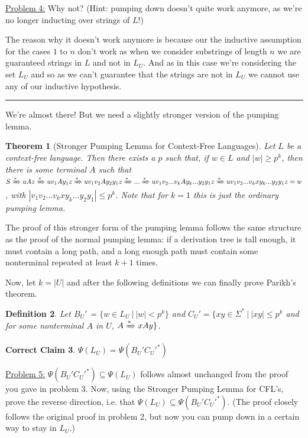 \documentclass[11pt]{article}
\newcounter{lecnum}
\newtheorem{theorem}{Theorem}[lecnum]
\newtheorem{definition}[theorem]{Definition}
\newtheorem{goodclaim}[theorem]{Correct Claim}
\newenvironment{proof}{{\bf Proof:}}{\hfill\rule{2mm}{2mm}}
\begin{document}
\underline{Problem 4:} Why not? (Hint: pumping down doesn't quite work anymore, as we're no longer inducting over strings of $L$!) \hbreak \newline

\begin{proof}
  The reason why it doesn't work anymore is because our the inductive assumption for the cases $1$ to $n$ don't work as when we consider substrings of length $n$ we are guaranteed strings in $L$ and not in $L_U$. And as in this case we're considering the set $L_U$ and so as we can't guarantee that the strings are not in $L_U$  we cannot use any of our inductive hypothesis.
\end{proof}

We're almost there! But we need a slightly stronger version of the pumping lemma.

\begin{theorem} [Stronger Pumping Lemma for Context-Free Languages]
Let $L$ be a context-free language. Then there exists a $p$ such that, if $w \in L$ and $|w| \geq p^k$, then there is some terminal $A$ such that $S \xRightarrow{*} uAz \xRightarrow{*} uv_1Ay_1z \xRightarrow{*} uv_1v_2Ay_2y_1z \xRightarrow{*} ... \xRightarrow{*} uv_1v_2...v_kAy_k...y_2y_1z \xRightarrow{*} uv_1v_2...v_kxy_k...y_2y_1z = w$, with $|v_1v_2...v_kxy_k...y_2y_1| \leq p^k$. Note that for $k=1$ this is just the ordinary pumping lemma.
\end{theorem}

The proof of this stronger form of the pumping lemma follows the same structure as the proof of the normal pumping lemma: if a derivation tree is tall enough, it must contain a long path, and a long enough path must contain some nonterminal repeated at least $k+1$ times. \hbreak \newline

Now, let $k = |U|$ and after the following definitions we can finally prove Parikh's theorem.

\begin{definition}
Let $B_U'$ = $\{w \in L_U ~|~ |w| < p^k\}$ and $C_U' = \{xy \in \Sigma^* ~|~ |xy| \leq p^k$ and for some nonterminal $A$ in $U$, $A \xRightarrow{*} xAy\}$.
\end{definition}

\begin{goodclaim}
$\Psi(L_U) = \Psi(B_U'C_U'^*)$ 
\end{goodclaim}

\underline{Problem 5:} $\Psi(B_U'C_U'^*) \subseteq \Psi(L_U)$ follows almost unchanged from the proof you gave in problem 3. Now, using the Stronger Pumping Lemma for CFL's, prove the reverse direction, i.e. that $\Psi(L_U) \subseteq \Psi(B_U'C_U'^*)$. (The proof closely follows the original proof in problem 2, but now you can pump down in a certain way to stay in $L_U$.)
\end{document}
